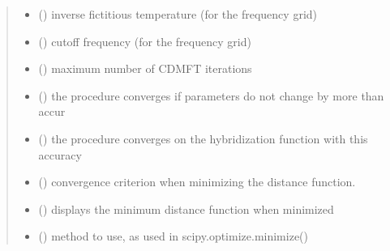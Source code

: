 \documentclass[letterpaper,10pt,english]{sphinxmanual}
\begin{document}
\begin{fulllineitems}
\begin{quote}
\begin{description}
\begin{itemize}
\item {} 
\sphinxAtStartPar
{} () \textendash{} inverse fictitious temperature (for the frequency grid)

\item {} 
\sphinxAtStartPar
{} () \textendash{} cutoff frequency (for the frequency grid)

\item {} 
\sphinxAtStartPar
{} () \textendash{} maximum number of CDMFT iterations

\item {} 
\sphinxAtStartPar
{} () \textendash{} the procedure converges if parameters do not change by more than accur

\item {} 
\sphinxAtStartPar
{} () \textendash{} the procedure converges on the hybridization function with this accuracy

\item {} 
\sphinxAtStartPar
{} () \textendash{} convergence criterion when minimizing the distance function.

\item {} 
\sphinxAtStartPar
{} () \textendash{} displays the minimum distance function when minimized

\item {} 
\sphinxAtStartPar
{} () \textendash{} method to use, as used in scipy.optimize.minimize()


\end{itemize}
\end{description}
\end{quote}
\end{fulllineitems}
\end{document}
